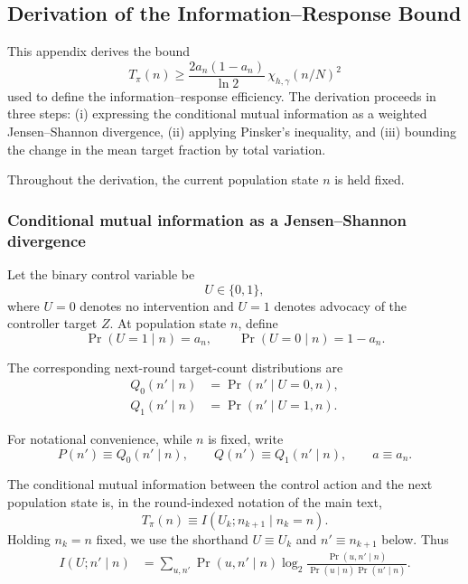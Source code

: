 
\subsection{Derivation of the Information--Response Bound}
\label{app:information_response_bound}

This appendix derives the bound
\begin{equation}
\boxed{
T_\pi(n)
\ge
\frac{2a_n(1-a_n)}{\ln 2}\,
\chi_{h,\gamma}(n/N)^2
}
\label{eq:IR_bound_final}
\end{equation}
used to define the information--response efficiency.
The derivation proceeds in three steps:
(i) expressing the conditional mutual information as a weighted
Jensen--Shannon divergence,
(ii) applying Pinsker's inequality, and
(iii) bounding the change in the mean target fraction by total variation.

Throughout the derivation, the current population state \(n\) is held fixed.

\subsubsection{Conditional mutual information as a Jensen--Shannon divergence}

Let the binary control variable be
\[
U\in\{0,1\},
\]
where \(U=0\) denotes no intervention and \(U=1\) denotes advocacy of
the controller target \(Z\). At population state \(n\), define
\begin{equation}
\Pr(U=1\mid n)=a_n,
\qquad
\Pr(U=0\mid n)=1-a_n.
\end{equation}

The corresponding next-round target-count distributions are
\begin{align}
Q_0(n'\mid n)
&=
\Pr(n'\mid U=0,n),
\\
Q_1(n'\mid n)
&=
\Pr(n'\mid U=1,n).
\end{align}

For notational convenience, while \(n\) is fixed, write
\begin{equation}
P(n')\equiv Q_0(n'\mid n),
\qquad
Q(n')\equiv Q_1(n'\mid n),
\qquad
a\equiv a_n.
\label{eq:PQ_definitions}
\end{equation}

The conditional mutual information between the control action and the
next population state is, in the round-indexed notation of the main text,
\[
T_\pi(n)\equiv I(U_k;n_{k+1}\mid n_k=n).
\]
Holding \(n_k=n\) fixed, we use the shorthand \(U\equiv U_k\) and
\(n'\equiv n_{k+1}\) below. Thus
\begin{align}
I(U;n'\mid n)
&=
\sum_{u,n'}
\Pr(u,n'\mid n)
\log_2
\frac{
\Pr(u,n'\mid n)
}{
\Pr(u\mid n)\Pr(n'\mid n)
}.
\label{eq:conditional_mi_start}
\end{align}

